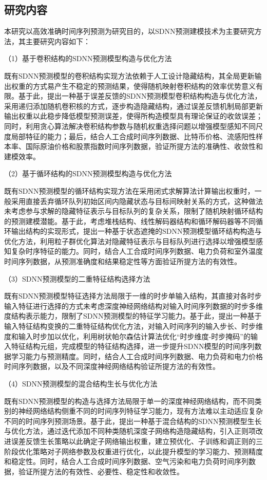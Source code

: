 \subsection{研究内容}
本研究以高效准确时间序列预测为研究目的，以SDNN预测建模技术为主要研究方法，其主要研究内容如下：

（1）基于卷积结构的SDNN预测模型构造与优化方法

既有SDNN预测模型的卷积结构实现方法依赖于人工设计隐藏结构，其全局更新输出权重的方式易产生不稳定的预测结果，使得随机映射卷积结构的效率优势意义有限。基于此，提出一种基于误差反馈的SDNN预测模型卷积结构构造与优化方法，采用递归添加随机卷积核的方式，逐步构造隐藏结构，通过误差反馈机制局部更新输出权重以此稳步降低模型预测误差，使得所构造模型具有理论保证的收敛误差；同时，利用贪心算法解决卷积结构参数与随机权重选择问题以增强模型感知不同尺度局部特征的能力；最后，结合人工合成时间序列数据、比特币价格、流感阳性样本率、国际原油价格和股票指数时间序列数据，验证所提方法的准确性、收敛性和建模效率。

（2）基于循环结构的SDNN预测模型构造与优化方法

既有SDNN预测模型的循环结构实现方法在采用闭式求解算法计算输出权重时，一般采用直接丢弃循环队列初始区间内隐藏状态与目标间映射关系的方式，这种做法未考虑参与求解的隐藏特征表示与目标队列的复杂关系，限制了随机映射循环结构的预测建模潜能。基于此，考虑堆栈结构、线性解码器结构和循环解码器等不同循环输出结构的实现形式，提出一种基于状态遮掩的SDNN预测模型循环结构构造与优化方法，利用粒子群优化算法对隐藏特征表示与目标队列进行选择以增强模型感知复杂时序特征的能力。同时，结合人工合成时间序列数据、电力负荷和室外温度时间序列数据，从预测准确度和结果稳定性等方面验证所提方法的有效性。

（3）SDNN预测模型的二重特征结构选择方法

既有SDNN预测模型特征选择方法局限于一维的时步单输入结构，其直接对各时步输入特征进行选择的方式未考虑深度神经网络结构对输入时间序列数据的时步多维度结构表示能力，限制了SDNN预测模型的特征学习能力。基于此，提出一种基于输入特征结构变换的二重特征结构优化方法，对输入时间序列的输入步长、时步维度和输入时步加以优化，利用树状帕尔森估计算法优化“时步维度-时步掩码”的输入特征结构元组，完成模型的特征结构选择，进一步提升SDNN模型的时间序列数据学习能力与预测精度。同时，结合人工合成时间序列数据、电力负荷和电力价格时间序列数据，以及不同深度神经网络结构验证所提方法的有效性。

（4）SDNN预测模型的混合结构生长与优化方法

既有SDNN预测模型的构造与选择方法局限于单一的深度神经网络结构，而不同类别的神经网络结构侧重不同的时间序列特征学习能力，现有方法难以主动适应复杂不同的时间序列预测场景。基于此，提出一种基于混合结构的SDNN预测模型生长与优化方法，通过迭代添加不同种类随机深度子网络构造隐藏结构，引入正则项改进误差反馈生长策略以此确定子网络输出权重，建立预优化、子训练和调正则的三阶段优化策略对子网络参数及权重进行优化，以此提升模型的学习能力、预测精度和稳定性。同时，结合人工合成时间序列数据、空气污染和电力负荷时间序列数据，验证所提方法的有效性、必要性、稳定性和收敛性。



